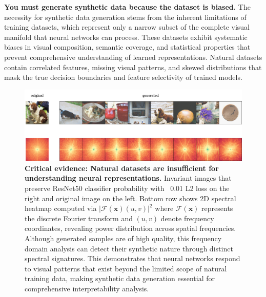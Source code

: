 \textbf{You must generate synthetic data because the dataset is biased.} The necessity for synthetic data generation stems from the inherent limitations of training datasets, which represent only a narrow subset of the complete visual manifold that neural networks can process. These datasets exhibit systematic biases in visual composition, semantic coverage, and statistical properties that prevent comprehensive understanding of learned representations. Natural datasets contain correlated features, missing visual patterns, and skewed distributions that mask the true decision boundaries and feature selectivity of trained models.

\begin{figure}[h]
\centering
\includegraphics[width=\linewidth]{figures/main/spectral_analysis_1.png}
\caption{\textbf{Critical evidence: Natural datasets are insufficient for understanding neural representations.} Invariant images that preserve ResNet50 classifier probability with ~0.01 L2 loss on the right and original image on the left. Bottom row shows 2D spectral heatmap computed via $|\mathcal{F}(\mathbf{x})(u,v)|^2$ where $\mathcal{F}(\mathbf{x})$ represents the discrete Fourier transform and $(u,v)$ denote frequency coordinates, revealing power distribution across spatial frequencies. Although generated samples are of high quality, this frequency domain analysis can detect their synthetic nature through distinct spectral signatures. This demonstrates that neural networks respond to visual patterns that exist beyond the limited scope of natural training data, making synthetic data generation essential for comprehensive interpretability analysis.}
\label{fig:dataset_bias_evidence}
\end{figure}

